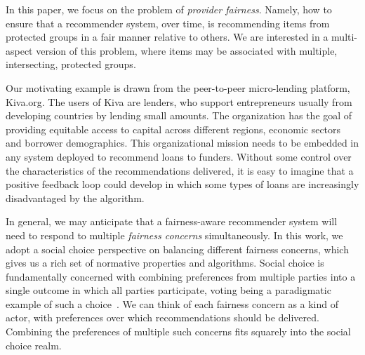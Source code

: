 


In this paper, we focus on the problem of \textit{provider fairness}. Namely, how to ensure that a recommender system, over time, is recommending items from protected groups in a fair manner relative to others. We are interested in a multi-aspect version of this problem, where items may be associated with multiple, intersecting, protected groups.

Our motivating example is drawn from the peer-to-peer micro-lending platform, Kiva.org. The users of Kiva are lenders, who support entrepreneurs usually from developing countries by lending small amounts. The organization has the goal of providing equitable access to capital across different regions, economic sectors and borrower demographics. This organizational mission needs to be embedded in any system deployed to recommend loans to funders. Without some control over the characteristics of the recommendations delivered, it is easy to imagine that a positive feedback loop \cite{sun2019debiasing} could develop in which some types of loans are increasingly disadvantaged by the algorithm.

In general, we may anticipate that a fairness-aware recommender system will need to respond to multiple \textit{fairness concerns} simultaneously. In this work, we adopt a social choice perspective \cite{BCELP16a} on balancing different fairness concerns, which gives us a rich set of normative properties and algorithms. Social choice is fundamentally concerned with combining preferences from multiple parties into a single outcome in which all parties participate, voting being a paradigmatic example of such a choice~\cite{Zwicker:Voting}. We can think of each fairness concern as a kind of actor, with preferences over which recommendations should be delivered. Combining the preferences of multiple such concerns fits squarely into the social choice realm.

